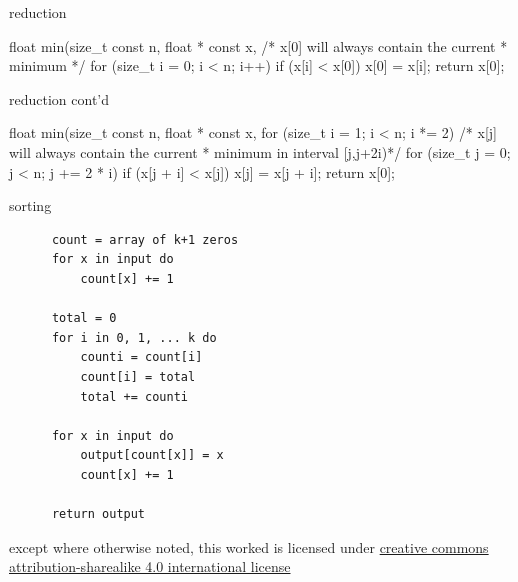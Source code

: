 \documentclass[10pt, t]{beamer}
\begin{document}
  \begin{frame}[fragile]{reduction}
    \begin{codeblock}
    float
    min(size_t const n,
        float * const x,
    {
      /* x[0] will always contain the current
       * minimum */
      for (size_t i = 0; i < n; i++) {
        if (x[i] < x[0]) {
          x[0] = x[i];
        }
      }
      return x[0];
    }
    \end{codeblock}
  \end{frame}

  \begin{frame}[fragile]{reduction cont'd}
    \begin{codeblock}
    float
    min(size_t const n,
        float * const x,
    {
      for (size_t i = 1; i < n; i *= 2) {
        /* x[j] will always contain the current
         * minimum in interval [j,j+2i)*/
        for (size_t j = 0; j < n; j += 2 * i) {
          if (x[j + i] < x[j]) {
            x[j] = x[j + i];
          }
        }
      }
      return x[0];
    }
    \end{codeblock}
  \end{frame}

  \begin{frame}[fragile]{sorting}
    \begin{verbatim}
      count = array of k+1 zeros
      for x in input do
          count[x] += 1

      total = 0
      for i in 0, 1, ... k do
          counti = count[i]
          count[i] = total
          total += counti

      for x in input do
          output[count[x]] = x
          count[x] += 1

      return output
    \end{verbatim}
  \end{frame}

  \appendix

  \begin{frame}[c]
    \begin{center}\ccbysa\end{center}

    except where otherwise noted, this worked is licensed under
    \href{http://creativecommons.org/licenses/by-sa/4.0/}{creative commons
    attribution-sharealike 4.0 international license}
  \end{frame}
\end{document}
